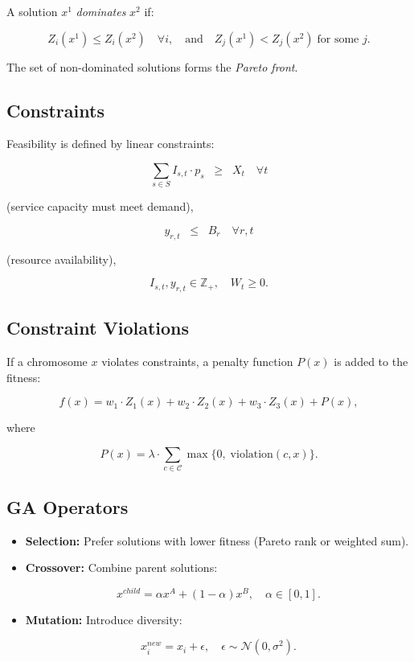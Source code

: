 \documentclass[12pt,a4paper]{article}
\begin{document}
	A solution $x^1$ \emph{dominates} $x^2$ if:
	
	
	\[
	Z_i(x^1) \leq Z_i(x^2) \quad \forall i, 
	\quad \text{and} \quad 
	Z_j(x^1) < Z_j(x^2) \; \text{for some } j.
	\]
	
	
	The set of non-dominated solutions forms the \emph{Pareto front}.
	
	\subsection{Constraints}
	
	Feasibility is defined by linear constraints:
	
	
	\[
	\sum_{s \in S} I_{s,t} \cdot p_s \;\; \geq \;\; X_t \quad \forall t
	\]
	
	
	(service capacity must meet demand),
	
	
	\[
	y_{r,t} \;\; \leq \;\; B_r \quad \forall r,t
	\]
	
	
	(resource availability),
	
	
	\[
	I_{s,t}, y_{r,t} \in \mathbb{Z}_+, \quad W_t \geq 0.
	\]
	
	
	
	\subsection{Constraint Violations}
	
	If a chromosome $x$ violates constraints, a penalty function $P(x)$ is added to the fitness:
	
	
	\[
	f(x) = w_1 \cdot Z_1(x) + w_2 \cdot Z_2(x) + w_3 \cdot Z_3(x) + P(x),
	\]
	
	
	where
	
	
	\[
	P(x) = \lambda \cdot \sum_{c \in \mathcal{C}} \max\{0, \; \text{violation}(c,x)\}.
	\]
	
	
	
	\subsection{GA Operators}
	
	\begin{itemize}
		\item \textbf{Selection:} Prefer solutions with lower fitness (Pareto rank or weighted sum).
		\item \textbf{Crossover:} Combine parent solutions:
		
		
		\[
		x^{child} = \alpha x^A + (1-\alpha)x^B, \quad \alpha \in [0,1].
		\]
		
		
		\item \textbf{Mutation:} Introduce diversity:
		
		
		\[
		x_i^{new} = x_i + \epsilon, \quad \epsilon \sim \mathcal{N}(0,\sigma^2).
		\]
		
		
	\end{itemize}
	
\end{document}
